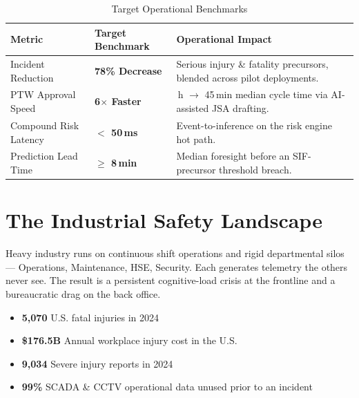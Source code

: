 \documentclass[11pt,a4paper]{article}
\begin{document}
\begin{table}[htbp]
\centering
\caption{Target Operational Benchmarks}
\begin{tabularx}{\textwidth}{
>{\raggedright\arraybackslash}p{}
>{\centering\arraybackslash}p{}
>{\raggedright\arraybackslash}X
}
\toprule
\textbf{Metric} & \textbf{Target Benchmark} & \textbf{Operational Impact} \\
\midrule
Incident Reduction & \textbf{78\% Decrease} & Serious injury \& fatality precursors, blended across pilot deployments. \\
PTW Approval Speed & \textbf{6$\times$ Faster} & 4.5\,h $\rightarrow$ 45\,min median cycle time via AI-assisted JSA drafting. \\
Compound Risk Latency & \textbf{$<$ 50\,ms} & Event-to-inference on the risk engine hot path. \\
Prediction Lead Time & \textbf{$\ge$ 8\,min} & Median foresight before an SIF-precursor threshold breach. \\
\bottomrule
\end{tabularx}
\end{table}

\section{The Industrial Safety Landscape}
Heavy industry runs on continuous shift operations and rigid departmental silos — Operations, Maintenance, HSE, Security. Each generates telemetry the others never see. The result is a persistent cognitive-load crisis at the frontline and a bureaucratic drag on the back office.

\begin{itemize}
    \item \textbf{5,070} U.S. fatal injuries in 2024
    \item \textbf{\$176.5B} Annual workplace injury cost in the U.S.
    \item \textbf{9,034} Severe injury reports in 2024
    \item \textbf{99\%} SCADA \& CCTV operational data unused prior to an incident
\end{itemize}

\end{document}
